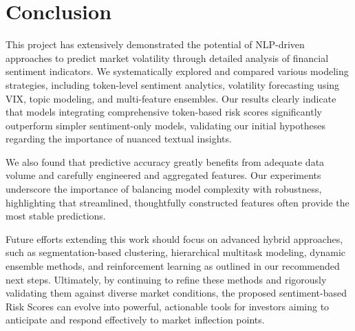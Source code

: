 \documentclass[twocolumn]{article}
\begin{document}
\section{Conclusion}

This project has extensively demonstrated the potential of NLP-driven approaches to predict market volatility through detailed analysis of financial sentiment indicators. We systematically explored and compared various modeling strategies, including token-level sentiment analytics, volatility forecasting using VIX, topic modeling, and multi-feature ensembles. Our results clearly indicate that models integrating comprehensive token-based risk scores significantly outperform simpler sentiment-only models, validating our initial hypotheses regarding the importance of nuanced textual insights.

We also found that predictive accuracy greatly benefits from adequate data volume and carefully engineered and aggregated features. Our experiments underscore the importance of balancing model complexity with robustness, highlighting that streamlined, thoughtfully constructed features often provide the most stable predictions.

Future efforts extending this work should focus on advanced hybrid approaches, such as segmentation-based clustering, hierarchical multitask modeling, dynamic ensemble methods, and reinforcement learning as outlined in our recommended next steps. Ultimately, by continuing to refine these methods and rigorously validating them against diverse market conditions, the proposed sentiment-based Risk Scores can evolve into powerful, actionable tools for investors aiming to anticipate and respond effectively to market inflection points.

\clearpage
\end{document}
